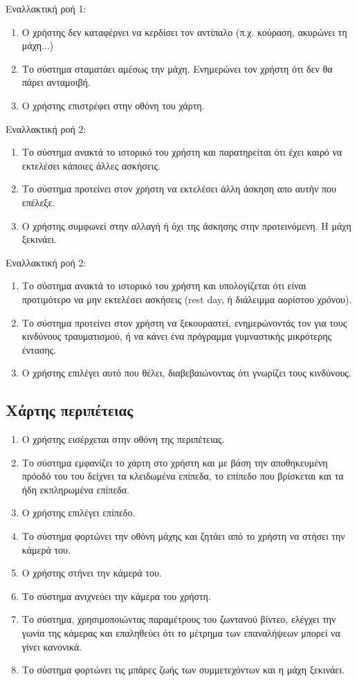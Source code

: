 Εναλλακτική ροή 1:
\begin{enumerate}[label=5.\alph*.,ref=2.\alph*]
    \item Ο χρήστης δεν καταφέρνει να κερδίσει τον αντίπαλο (π.χ. κούραση, ακυρώνει τη μάχη...)
    \item Το σύστημα σταματάει αμέσως την μάχη. Ενημερώνει τον χρήστη ότι δεν θα πάρει ανταμοιβή.
    \item Ο χρήστης επιστρέφει στην οθόνη του χάρτη.
\end{enumerate}

Εναλλακτική ροή 2:
\begin{enumerate}[label=2.\alph*.,ref=2.\alph*]
    \item Το σύστημα ανακτά το ιστορικό του χρήστη και παρατηρείται ότι έχει καιρό να εκτελέσει κάποιες άλλες ασκήσεις.
    \item Το σύστημα προτείνει στον χρήστη να εκτελέσει άλλη άσκηση απο αυτήν που επέλεξε.
    \item Ο χρήστης συμφωνεί στην αλλαγή ή όχι της άσκησης στην προτεινόμενη. Η μάχη ξεκινάει.
\end{enumerate}

Εναλλακτική ροή 2:
\begin{enumerate}[label=2.\alph*.,ref=2.\alph*]
    \item Το σύστημα ανακτά το ιστορικό του χρήστη και υπολογίζεται ότι είναι προτιμότερο να μην εκτελέσει ασκήσεις (rest day, ή διάλειμμα αορίστου χρόνου).
    \item Το σύστημα προτείνει στον χρήστη να ξεκουραστεί, ενημερώνοντάς τον για τους κινδύνους τραυματισμού, ή να κάνει ένα πρόγραμμα γυμναστικής μικρότερης έντασης.
    \item Ο χρήστης επιλέγει αυτό που θέλει, διαβεβαιώνοντας ότι γνωρίζει τους κινδύνους.
\end{enumerate}

\newpage
\subsection{Χάρτης περιπέτειας}
\label{sec:map}
\begin{enumerate}
    \item Ο χρήστης εισέρχεται στην οθόνη της περιπέτειας.
    \item Το σύστημα εμφανίζει το χάρτη στο χρήστη και με βάση την αποθηκευμένη πρόοδό του του δείχνει τα κλειδωμένα επίπεδα, το επίπεδο που βρίσκεται και τα ήδη εκπληρωμένα επίπεδα. 
    \item Ο χρήστης επιλέγει επίπεδο.
    \item Το σύστημα φορτώνει την οθόνη μάχης και ζητάει από το χρήστη να στήσει την κάμερά του.
    \item Ο χρήστης στήνει την κάμερά του.
    \item Το σύστημα ανιχνεύει την κάμερα του χρήστη. 
    \item Το σύστημα, χρησιμοποιώντας παραμέτρους του ζωντανού βίντεο, ελέγχει την γωνία της κάμερας και επαληθεύει ότι το μέτρημα των επαναλήψεων μπορεί να γίνει κανονικά.
    \item Το σύστημα φορτώνει τις μπάρες ζωής των συμμετεχόντων και η μάχη ξεκινάει.
\end{enumerate}


